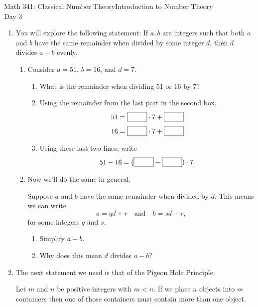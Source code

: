 \documentclass[12pt]{article}
\begin{document}
	\noindent Math 341: Classical Number Theory\hfill Introduction to Number Theory\\
	\mbox{}\hfill Day 3
	
	
	\begin{enumerate}
		\item You will explore the following statement: If $a,b$ are integers such that both $a$ and $b$ have the same remainder when divided by some integer $d$, then $d$ divides $a-b$ evenly.
		
		\begin{enumerate}
			\item Consider $a=51$, $b=16$, and $d=7$.  
				\begin{enumerate}
					\item What is the remainder when dividing 51 or 16 by 7?
					\item Using the remainder from the last part in the second box,
						$$51=\fbox{\color{white}ABC}\cdot7+\fbox{\color{white}ABC}$$
						$$16=\fbox{\color{white}ABC}\cdot7+\fbox{\color{white}ABC}$$
					\item Using these last two lines, write
						$$51-16=(\fbox{\color{white}ABC}-\fbox{\color{white}ABC})\cdot 7.$$
				\end{enumerate}
			\item Now we'll do the same in general.
				
				Suppose $a$ and $b$ have the same remainder when divided by $d$.  This means we can write
						$$a=qd+r\quad\text{and}\quad b=sd+r,$$ 
					for some integers $q$ and $s$.
				
				\begin{enumerate}
					\item Simplify $a-b$.\vskip 1in
					\item Why does this mean $d$ divides $a-b$?\vskip 1in
				\end{enumerate}
		\end{enumerate}
		\item The next statement we need is that of the Pigeon Hole Principle.
		
			Let $m$ and $n$ be positive integers with $m<n$. If we place $n$ objects into $m$ containers then one of those containers must contain more than one object.
			

\end{enumerate}
\end{document}
